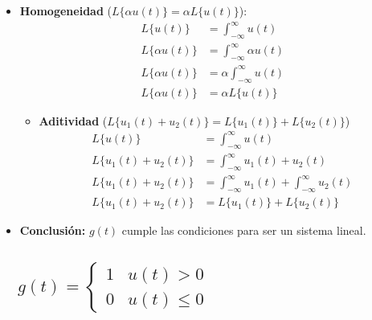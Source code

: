 \documentclass[12pt,a4paper]{article}
\begin{document}
\begin{itemize}
    \item  \textbf{Homogeneidad} ($L\{\alpha u(t)\} = \alpha L\{u(t)\}$):
    \begin{align*}
        L\{u(t)\} &= \int^{\infty}_{-\infty}u(t) \\
        L\{\alpha u(t)\} &= \int^{\infty}_{-\infty}\alpha u(t) \\
        L\{\alpha u(t)\} &= \alpha \int^{\infty}_{-\infty} u(t)\\
        L\{\alpha u(t)\} &= \alpha L\{u(t)\}
    \end{align*}
    \begin{itemize}
        \item \textbf{Aditividad} ($L\{u_1(t)+u_2(t)\}=L\{u_1(t)\}+ L\{u_2(t)\}$)
        \begin{align*}
            L\{u(t)\} &= \int^{\infty}_{-\infty}u(t) \\
            L\{u_1(t)+u_2(t)\} &=  \int^{\infty}_{-\infty}u_1(t)+u_2(t)\\
            L\{u_1(t)+u_2(t)\} &=  \int^{\infty}_{-\infty}u_1(t)+ \int^{\infty}_{-\infty}u_2(t)\\
            L\{u_1(t)+u_2(t)\} &= L\{u_1(t)\} + L\{u_2(t)\}
         \end{align*}
    \end{itemize}
    \item \textbf{Conclusión:} $g(t)$ cumple las condiciones para ser un sistema lineal.
\end{itemize}

\subsection{$
\quad g(t) =
\begin{cases}
1 & u(t) > 0 \\
0 & u(t) \leq 0
\end{cases}
$}
\end{document}
